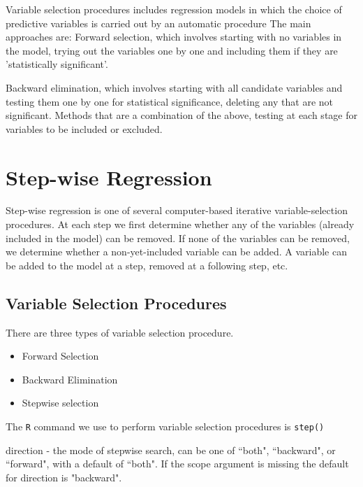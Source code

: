 \documentclass[a4paper,12pt]{article}
\begin{document}
Variable selection procedures includes regression models in which the choice of predictive variables is carried out by an automatic procedure
The main approaches are:
Forward selection, which involves starting with no variables in the model, trying out the variables one by one and including them if they are 'statistically significant'.

Backward elimination, which involves starting with all candidate variables and testing them one by one for statistical significance, deleting any that are not significant.
Methods that are a combination of the above, testing at each stage for variables to be included or excluded.

\section{Step-wise Regression}
Step-wise regression is one of several computer-based iterative variable-selection procedures. At each step we first determine whether any of the variables (already included in the model) can be removed. If none of the variables can be removed, we determine whether a non-yet-included variable can be added. A variable can be added to the model at a step, removed at a following step, etc.


\subsection{Variable Selection Procedures}

There are three types of variable selection procedure.
\begin{itemize}
\item Forward Selection
\item Backward Elimination
\item Stepwise selection
\end{itemize}


The \texttt{R} command we use to perform variable selection procedures is \texttt{step()}

direction  - the mode of stepwise search, can be one of ``both", ``backward", or ``forward", with a default of ``both". If the scope argument is missing the default for direction is "backward".
\newpage
\end{document}
